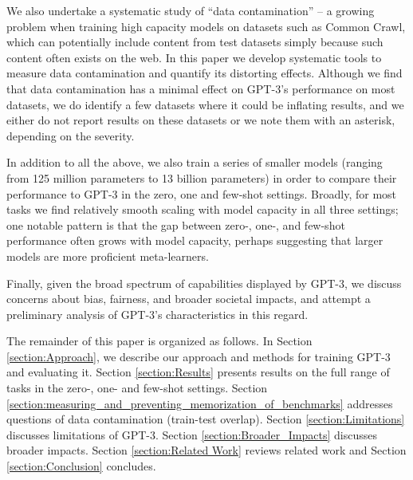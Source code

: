 We also undertake a systematic study of ``data contamination'' -- a growing problem when training high capacity models on datasets such as Common Crawl, which can potentially include content from test datasets simply because such content often exists on the web. In this paper we develop systematic tools to measure data contamination and quantify its distorting effects.  Although we find that data contamination has a minimal effect on GPT-3's performance on most datasets, we do identify a few datasets where it could be inflating results, and we either do not report results on these datasets or we note them with an asterisk, depending on the severity.

In addition to all the above, we also train a series of smaller models (ranging from 125 million parameters to 13 billion parameters) in order to compare their performance to GPT-3 in the zero, one and few-shot settings.  Broadly, for most tasks we find relatively smooth scaling with model capacity in all three settings; one notable pattern is that the gap between zero-, one-, and few-shot performance often grows with model capacity, perhaps suggesting that larger models are more proficient meta-learners.

Finally, given the broad spectrum of capabilities displayed by GPT-3, we discuss concerns about bias, fairness, and broader societal impacts, and attempt a preliminary analysis of GPT-3's characteristics in this regard.

The remainder of this paper is organized as follows.  In Section \ref{section:Approach}, we describe our approach and methods for training GPT-3 and evaluating it.  Section \ref{section:Results} presents results on the full range of tasks in the zero-, one- and few-shot settings.  Section \ref{section:measuring_and_preventing_memorization_of_benchmarks} addresses questions of data contamination (train-test overlap).  Section \ref{section:Limitations} discusses limitations of GPT-3.  Section \ref{section:Broader_Impacts} discusses broader impacts.  Section \ref{section:Related Work} reviews related work and Section \ref{section:Conclusion} concludes.

